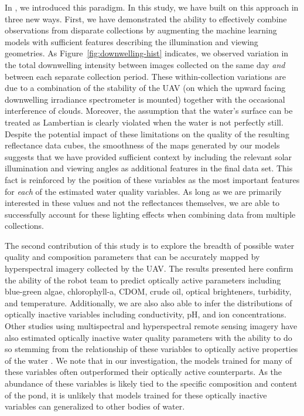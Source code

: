 \documentclass[remotesensing,article,submit,pdftex,moreauthors]{Definitions/mdpi}
\begin{document}
In \cite{robotTeam1}, we introduced this paradigm. In this study, we have built on this approach in three new ways. First, we have demonstrated the ability to effectively combine observations from disparate collections by augmenting the machine learning models with sufficient features describing the illumination and viewing geometries. As Figure~\ref{fig:downwelling-hist} indicates, we observed variation in the total downwelling intensity between images collected on the same day \textit{and} between each separate collection period. These within-collection variations are due to a combination of the stability of the UAV (on which the upward facing downwelling irradiance spectrometer is mounted) together with the occasional interference of clouds. Moreover, the assumption that the water's surface can be treated as Lambertian is clearly violated when the water is not perfectly still. Despite the potential impact of these limitations on the quality of the resulting reflectance data cubes, the smoothness of the maps generated by our models suggests that we have provided sufficient context by including the relevant solar illumination and viewing angles as additional features in the final data set.  This fact is reinforced by the position of these variables as the most important features for \textit{each} of the estimated water quality variables. As long as we are primarily interested in these values and not the reflectances themselves, we are able to successfully account for these lighting effects when combining data from multiple collections.

The second contribution of this study is to explore the breadth of possible water quality and composition parameters that can be accurately mapped by hyperspectral imagery collected by the UAV. The results presented here confirm the ability of the robot team to predict optically active parameters including blue-green algae, chlorophyll-a, CDOM, crude oil, optical brighteners, turbidity, and temperature. Additionally, we are also also able to infer the distributions of optically inactive variables including conductivity, pH, and ion concentrations. Other studies using multispectral and hyperspectral remote sensing imagery have also estimated optically inactive water quality parameters with the ability to do so stemming from the relationship of these variables to optically active properties of the water \cite{vakili2020determination,guo2021machine,niu2021deep}. We note that in our investigation, the models trained for many of these variables often outperformed their optically active counterparts. As the abundance of these variables is likely tied to the specific composition and content of the pond, it is unlikely that models trained for these optically inactive variables can generalized to other bodies of water. 
\end{document}
